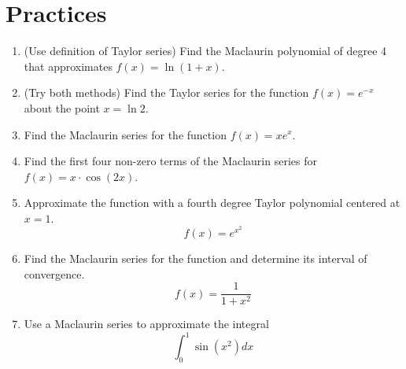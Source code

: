 \newpage
\section*{Practices}
\begin{enumerate}
\item (Use definition of Taylor series) Find the Maclaurin polynomial of degree 4 that approximates $f(x)=\ln (1+x)$.
\item (Try both methods) Find the Taylor series for the function $f(x)=e^{-x}$ about the point $x=\ln 2$.
\item Find the Maclaurin series for the function $f(x)=x e^{x}$.
\item Find the first four non-zero terms of the Maclaurin series for $f(x)=x \cdot \cos (2 x)$.
\item Approximate the function with a fourth degree Taylor polynomial centered at $x=1$.
$$
f(x)=e^{x^{2}}
$$
\item Find the Maclaurin series for the function and determine its interval of convergence.
$$
f(x)=\frac{1}{1+x^{2}}
$$

\item Use a Maclaurin series to approximate the integral
$$
\int_{0}^{1} \sin \left(x^{2}\right) d x
$$
\end{enumerate}
